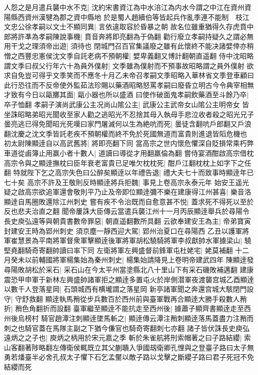 人怨之是月遣兵襲中水不克|{
	沈約宋書資江為中水涪江為内水今謂之中江在資州資陽縣西資州漢犍為郡之資中縣地}
於是蜀人趙續伯等皆起兵作亂季連不能制　枝江文忠公徐孝嗣以文士不顯同異|{
	言依違取容於昏暴之朝}
故名位雖重猶得久存虎賁中郎將許凖為孝嗣陳說事機|{
	賁音奔將即亮翻為于偽翻}
勸行廢立孝嗣持疑久之謂必無用干戈之理須帝出遊|{
	須待也}
閉城門召百官集議廢之雖有此懷終不能决諸嬖倖亦稍憎之西豐忠憲侯沈文季自託老病不預朝權|{
	嬖卑義翻又博計翻朝直遥翻}
侍中沈昭略謂文季曰叔父行年六十為員外僕射|{
	文季雖為僕射而不預事故昭略謂之員外僕射}
欲求自免豈可得乎文季笑而不應冬十月乙未帝召孝嗣文季昭略入華林省文季登車顧曰此行恐往而不反帝使外監茹法珍賜以藥酒昭略怒罵孝嗣曰廢昏立明古今令典宰相無才致有今日以甌擲其面|{
	甌小器也所以盛酒}
曰使作破面鬼孝嗣飲藥酒至斗餘乃卒|{
	卒子恤翻}
孝嗣子演尚武康公主况尚山隂公主|{
	武康公主武帝女山隂公主明帝女}
皆坐誅昭略弟昭光聞收至家人勸之逃昭光不忍捨其母入執母手悲泣收者殺之昭光兄子曇亮逃已得免聞昭光死嘆曰家門屠滅何以生為絶吭而死|{
	曇徒含翻吭戶郎翻又戶浪翻沈慶之沈文季皆託老疾不預朝權而終不免於死國無道而富貴則進退皆䧟危機也}
初太尉陳顯逹自以高武舊將|{
	將即亮翻下同}
當高宗之世内懷危懼深自貶損常乘朽弊車道從鹵簿止用羸小者十數人|{
	道讀曰導從才用翻羸倫為翻}
嘗侍宴酒酣啟高宗借枕高宗令與之顯逹撫枕曰臣年衰老富貴已足唯欠枕枕死|{
	酣戶江翻枕枕上如字下之任翻}
特就陛下乞之高宗失色曰公醉矣顯逹以年禮告退|{
	禮大夫七十而致事時顯逹年已七十矣}
高宗不許及王敬則反時顯逹將兵拒魏|{
	事見上卷高宗永泰元年}
始安王遥光疑之啟高宗欲追軍還會敬則平乃止及帝即位顯逹彌不樂在建康得江州甚喜|{
	樂音洛顯逹自馬圈敗還除江州刺史}
嘗有疾不令治既而自愈意甚不悦|{
	蓋求死不得死以至於反也悲夫治直之翻}
聞帝屢誅大臣傳云當遣兵襲江州十一月丙辰顯逹舉兵於尋陽令長史庾弘遠等與朝貴書數帝罪惡|{
	朝直遥翻數所具翻}
云欲奉建安王為主|{
	帝弟寶寅封建安王時為郢州刺史}
須京塵一靜西迎大駕|{
	郢州治夏口在尋陽西}
乙丑以護軍將軍崔慧景為平南將軍督衆軍擊顯逹後軍將軍胡松驍騎將軍李叔獻帥水軍據梁山|{
	驍堅堯翻騎奇寄翻帥讀曰率下同}
左衛將軍左興盛督前鋒軍屯杜姥宅|{
	姥莫補翻}
十二月癸未以前輔國將軍楊集始為秦州刺史|{
	楊集始請降見上卷明帝建武四年}
陳顯逹發尋陽敗胡松於采石|{
	采石山在今太平州當塗縣北八十里山下有采石磯敗補邁翻}
建康震恐甲申軍于新林左興盛帥諸軍拒之顯逹多置屯火於岸側潜軍夜渡襲宫城乙酉顯逹以數千人登落星岡|{
	石頭城西有横壠謂之落星岡}
新亭諸軍聞之奔還宫城大駭閉門設守|{
	守舒救翻}
顯逹執馬矟從步兵數百於西州前與臺軍戰再合顯逹大勝手殺數人矟折|{
	矟色角翻折而設翻}
臺軍繼至顯逹不能抗走至西州後|{
	據蕭子顯齊書顯逹走至西州後烏榜村}
騎官趙潭注刺顯逹墜馬斬之|{
	顯逹傳云潭注矟刺顯逹落馬蓋盡力注矟而刺之也騎官蓋在馬隊主副之下猶今傔官也騎奇寄翻刺七亦翻}
諸子皆伏誅長史庾弘遠炳之之子也|{
	庾炳之柄用於宋元嘉之季}
斬於朱雀航將刑索帽著之曰子路結纓|{
	索山客翻著陟略翻左傳衛侯輒既立其父蒯聵入爭國刼衛卿孔悝與之登臺子路曰太子無勇若燔臺半必舍孔叔太子懼下石乞孟黶以敵子路以戈擊之斷纓子路曰君子死冠不免結纓而死}
